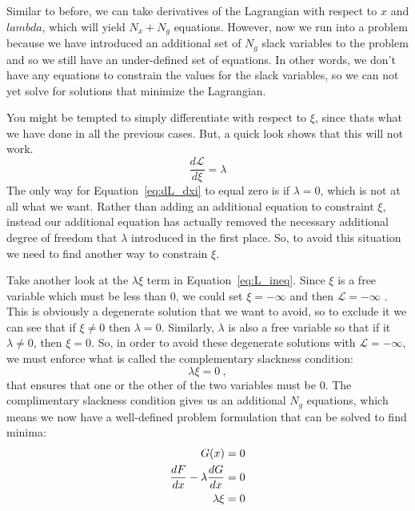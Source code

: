 \documentclass[conf]{new-aiaa}
\begin{document}
        Similar to before, we can take derivatives of the Lagrangian with respect to $x$ and $lambda$, which will yield 
        $N_x+N_g$ equations. 
        However, now we run into a problem because we have introduced an additional set of $N_g$ slack variables to the problem and so we still have an under-defined set of equations. 
        In other words, we don't have any equations to constrain the values for the slack variables, so we can not yet solve for solutions that minimize the Lagrangian. 

        You might be tempted to simply differentiate with respect to $\xi$, since thats what we have done in all the previous cases. 
        But, a quick look shows that this will not work.
        \begin{equation}
            \frac{d\mathcal{L}}{d\xi} = \lambda \label{eq:dL_dxi}
        \end{equation}
        The only way for Equation~\eqref{eq:dL_dxi} to equal zero is if $\lambda=0$, which is not at all what we want. 
        Rather than adding an additional equation to constraint $\xi$, instead our additional equation has actually removed the necessary additional degree of freedom that $\lambda$ introduced in the first place. 
        So, to avoid this situation we need to find another way to constrain $\xi$. 

        Take another look at the $\lambda \xi$ term in Equation~\eqref{eq:L_ineq}. 
        Since $\xi$ is a free variable which must be less than 0, we could set $\xi=-\infty$ and then $\mathcal{L}=-\infty$
        . 
        This is obviously a degenerate solution that we want to avoid, so to exclude it we can see that if $\xi \ne 0$ then $\lambda = 0$. 
        Similarly, $\lambda$ is also a free variable so that if it $\lambda\ne0$, then $\xi=0$. 
        So, in order to avoid these degenerate solutions with $\mathcal{L}=-\infty$, we must enforce what is called the complementary slackness condition: 
        \begin{equation}
            \lambda \xi = 0 \ , 
        \end{equation}
        that ensures that one or the other of the two variables must be 0. 
        The complimentary slackness condition gives us an additional $N_g$ equations, which means we now have a well-defined problem formulation that can be solved to find minima: 
        \begin{align}
            G(x) &= 0 \notag \\
            \frac{dF}{dx} - \lambda \frac{dG}{dx} &= 0 \notag \\
            \lambda \xi &= 0
            \label{eq:almost_kkt}
        \end{align}
\end{document}

